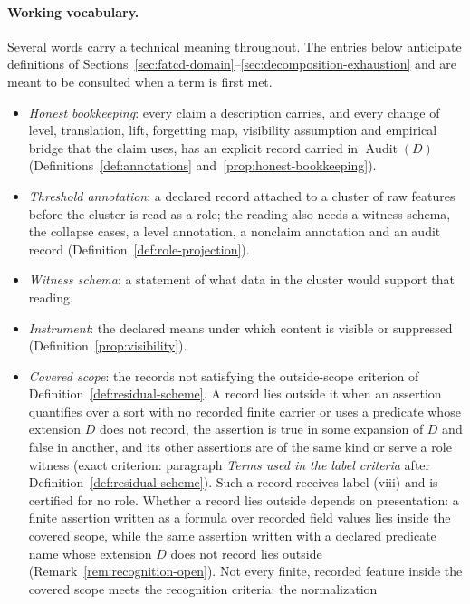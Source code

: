 \documentclass[11pt]{article}
\theoremstyle{definition}
\newcommand{\Audit}[1]{\ensuremath{\operatorname{Audit}\!\left(#1\right)}}
\begin{document}
\paragraph{Working vocabulary.} Several words carry a technical meaning
throughout. The entries below anticipate definitions of Sections~\ref{sec:fatcd-domain}--\ref{sec:decomposition-exhaustion} and are meant to be consulted when a term is first met.
\begin{itemize}[topsep=2pt,itemsep=1pt]
  \item \emph{Honest bookkeeping}: every claim a description carries, and
    every change of level, translation, lift, forgetting map, visibility
    assumption and empirical bridge that the claim uses, has an explicit
    record carried in \(\Audit{D}\) (Definitions~\ref{def:annotations} and~\ref{prop:honest-bookkeeping}).
  \item \emph{Threshold annotation}: a declared record attached to a
    cluster of raw features before the cluster is read as a role; the
    reading also needs a witness schema, the collapse cases, a level
    annotation, a nonclaim annotation and an audit record
    (Definition~\ref{def:role-projection}).
  \item \emph{Witness schema}: a statement of what data in the cluster
    would support that reading.
  \item \emph{Instrument}: the declared means under which content is
    visible or suppressed (Definition~\ref{prop:visibility}).
  \item \emph{Covered scope}: the records not satisfying the outside-scope
    criterion of Definition~\ref{def:residual-scheme}. A record lies outside it when an assertion quantifies over a
    sort with no recorded finite carrier or uses a predicate whose extension
    \(D\) does not record, the assertion is true in some expansion of
    \(D\) and false in another, and its other assertions are of the same kind or
    serve a role witness (exact criterion: paragraph \emph{Terms used in the
    label criteria} after Definition~\ref{def:residual-scheme}). Such a
    record receives label (viii) and is certified for no role. Whether a
    record lies outside depends on presentation: a finite assertion written
    as a formula over recorded field values lies inside the covered scope,
    while the same assertion written with a declared predicate name whose
    extension \(D\) does not record lies outside
    (Remark~\ref{rem:recognition-open}). Not every finite, recorded feature
    inside the covered scope meets the recognition criteria: the normalization

\end{itemize}
\end{document}
